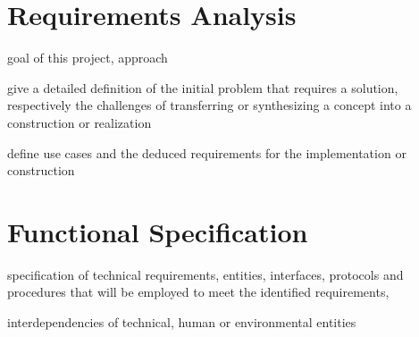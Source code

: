 \chapter{Requirements Analysis}
\label{chp:requirements}


\begin{shaded}
\noindent
goal of this project, approach

\medskip
\noindent
give a detailed definition of the initial problem that requires a solution, respectively the challenges of transferring or synthesizing a concept into a construction or realization

\medskip
\noindent
define use cases and the deduced requirements for the implementation or construction
\end{shaded}

\lipsum[21-24]


\chapter{Functional Specification}
\label{chp:specification}


\begin{shaded}
\noindent
specification of technical requirements, entities, interfaces, protocols and procedures that will be employed to meet the identified requirements,

\medskip
\noindent
interdependencies of technical, human or environmental entities
\end{shaded}

\lipsum[25-28]
